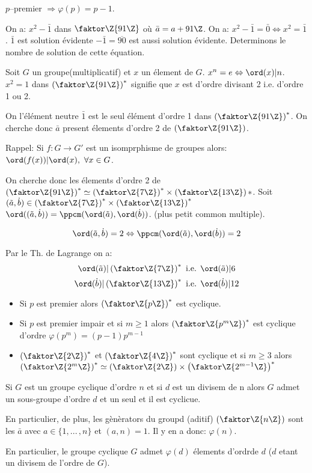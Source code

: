 $p$--premier $\Rightarrow \varphi (p)=p-1$.

On a: $x^2-\bar 1$ dans $\faktor\Z{91\Z}$ où $\bar a=a+91\Z$. On a: $x^2-\bar 1 =\bar 0 \Leftrightarrow x^2=\bar 1$. $\bar 1$ est solution évidente $-\bar 1=\overline{90}$ est aussi solution évidente. Determinons le nombre de solution de cette équation.

\begin{remark}
	Soit $G$ un groupe(multiplicatif) et $x$ un élement de $G$. $x^n=e\Leftrightarrow \ord(x)|n$. $x^2=1$ dans $\left(\faktor\Z{91\Z}\right)^\ast$ signifie que $x$ est d'ordre divisant 2 i.e. d'ordre 1 ou 2.
	
	On l'élément neutre $\bar 1$ est le seul élément d'ordre 1 dans $\left(\faktor\Z{91\Z}\right)^\ast$. On cherche donc $\bar a$ present élements d'ordre 2 de $\left(\faktor\Z{91\Z}\right)$. 
\end{remark}

Rappel: Si $f:G\rightarrow G'$ est un isomprphisme de groupes alors: $\ord(f(x))|\ord(x),\ \forall x\in G$.

On cherche donc les élements d'ordre 2 de $\left(\faktor\Z{91\Z}\right)^\ast\simeq \left(\faktor\Z{7\Z}\right)^\ast\times \left(\faktor\Z{13\Z}\right)
\ast$. Soit $(\tilde a, \dot b)\in \left( \faktor\Z{7\Z} \right)^\ast \times \left( \faktor\Z{13\Z} \right)^\ast$ $\ord((\tilde a,\dot b))=\ppcm(\ord(\tilde a),\ord(\dot b))$. (plus petit common multiple).

$$\ord(\tilde a, \dot b)=2\Leftrightarrow \ppcm(\ord(\tilde a),\ord(\dot b))=2$$

Par le Th. de Lagrange on a:
$$ \ord(\tilde a)|\left(\faktor\Z{7\Z}\right)^\ast\mbox{ i.e. } \ord(\tilde a)|6$$
$$\ord(\dot b) | \left(\faktor\Z{13\Z}\right)^\ast \mbox{ i.e. } \ord(\dot b) | 12$$

\begin{rappel}
	\begin{itemize}
		\item Si $p$ est premier alors $\left(\faktor\Z{p\Z}\right)^\ast$ est cyclique.
		\item Si $p$ est  premier impair et si $m\geq 1$ alors $\left(\faktor\Z{p^m\Z}\right)^\ast$ est cyclique d'ordre $\varphi (p^m)=(p-1)p^{m-1}$
		\item $\left(\faktor\Z{2\Z}\right)^\ast$ et $\left(\faktor\Z{4\Z}\right)^\ast$ sont cyclique et si $m\geq 3$ alors $\left(\faktor\Z{2^m\Z}\right)^\ast\simeq\left(\faktor\Z{2\Z}\right)\times \left(\faktor\Z{2^{m-1}\Z}\right)^\ast$
	\end{itemize}
	Si $G$ est un groupe cyclique d'ordre $n$ et si $d$ est un divisem de n alors $G$ admet un sous-groupe d'ordre $d$ et un seul et il est cyclicue.
	
	En particulier, de plus, les gènèrators du groupd (aditif) $\left(\faktor\Z{n\Z}\right)$ sont les $\bar a$ avec $a\in\{1,...\,,n\}$ et $(a,n)=1$. Il y en a donc: $\varphi (n)$.
	
	En particulier, le groupe cyclique $G$ admet $\varphi (d)$ élements d'ordrde $d$ ($d$ etant un divisem de l'ordre de $G$).
\end{rappel}

